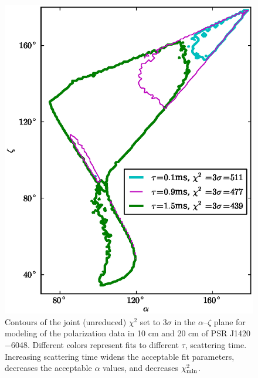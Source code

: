 \begin{figure}[t!!]
\begin{center}
\includegraphics[scale=.8]{chapters/applicationOfNumericalModel/figures/J1420ContoursMap.eps}
\caption[Contours of the joint (unreduced) $\chi^2$ set to $3\sigma$ in the $\alpha$--$\zeta$ plane for modeling of
the polarization data in 10 cm and 20 cm of PSR J1420$-$6048]{\label{fig:diffTau}
Contours of the joint (unreduced) $\chi^2$ set to $3\sigma$ in the $\alpha$--$\zeta$ plane for modeling of 
the polarization data in 10 cm and 20 cm of PSR J1420$-$6048.  
Different colors represent fits to different $\tau$, scattering time.  
Increasing scattering time widens the acceptable fit parameters, decreases the acceptable $\alpha$ 
values, and decreases $\chi^2_{\rm{min}}$.
}
\end{center}
\end{figure}


